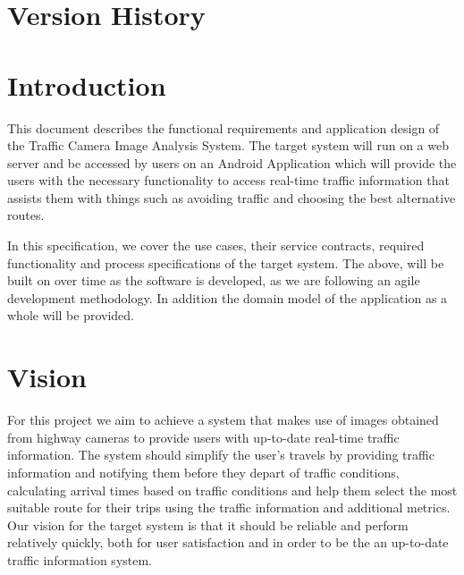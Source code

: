 \documentclass[a4paper,12pt]{article}
\begin{document}
\newpage
\tableofcontents
\newpage

\newpage
\section{Version History}
\newpage

\section{Introduction}
This document describes the functional requirements and application design of the Traffic Camera Image Analysis System. The target system will run on a web server  and be accessed by users on an Android Application which will provide the users with the necessary functionality to access real-time traffic information that assists them with things such as avoiding traffic and choosing the best alternative routes. 

In this specification, we cover the use cases, their service contracts, required functionality and process specifications of the target system. The above, will be built on over time as the software is developed, as we are following an agile development methodology. In addition the domain model of the application as a whole will be provided.
\section{Vision}
For this project we aim to achieve a system that makes use of images obtained from highway cameras to provide users with up-to-date real-time traffic information. The system should simplify the user's travels by providing traffic information and notifying them before they depart of traffic conditions, calculating arrival times based on traffic conditions and help them select the most suitable route for their trips using the traffic information and additional metrics. Our vision for the target system is that it should be reliable and perform relatively quickly, both for user satisfaction and in order to be the an up-to-date traffic information system.
\end{document}
